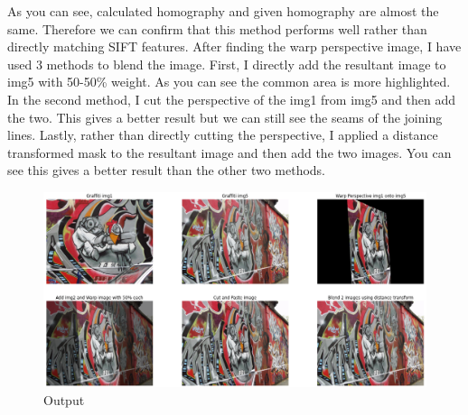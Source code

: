 \documentclass[a4paper]{article}
\begin{document}
As you can see, calculated homography and given homography are almost 
the same. Therefore we can confirm that this method performs well
rather than directly matching SIFT features. After finding the warp
 perspective image, I have used 3 methods to blend the image. First, 
 I directly add the resultant image to img5 with 50-50\% weight. 
 As you can see the common area is more highlighted. In the second 
 method, I cut the perspective of the img1 from img5 and then add 
 the two. This gives a better result but we can still see the seams 
 of the joining lines. Lastly, rather than directly cutting the 
 perspective, I applied a distance transformed mask to the resultant 
 image and then add the two images. You can see this gives a better 
 result than the other two methods.







\begin{figure}[!htb]
  \centering
  \includegraphics[width=\textwidth]{images/q3.png}
  \caption{Output}
  \label{q3}
\end{figure}
\end{document}
